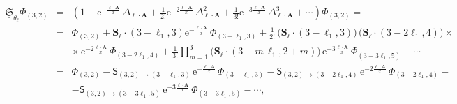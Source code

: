 \documentclass[11pt,a4paper]{article}
\newcommand{\rme}{{\mathrm{e}}}
\begin{document}
\begin{eqnarray}
\underline{\mathfrak{S}}_{\theta_{\boldsymbol{\ell}}} \Phi_{(3,2)} &=& \left( 1 + \rme^{-\frac{\boldsymbol{\ell} \cdot \boldsymbol{A}}{x}}\, \Delta_{\boldsymbol{\ell} \cdot \boldsymbol{A}} + \frac{1}{2!} \rme^{-2 \frac{\boldsymbol{\ell} \cdot \boldsymbol{A}}{x}}\, \Delta_{\boldsymbol{\ell} \cdot \boldsymbol{A}}^2 + \frac{1}{3!} \rme^{-3 \frac{\boldsymbol{\ell} \cdot \boldsymbol{A}}{x}}\, \Delta_{\boldsymbol{\ell} \cdot \boldsymbol{A}}^3 + \cdots \right) \Phi_{(3,2)} = \nonumber \\
&=& \Phi_{(3,2)} + \boldsymbol{S}_{\boldsymbol{\ell}} \cdot \left( 3-\ell_{1}, 3 \right) \rme^{-\frac{\boldsymbol{\ell} \cdot \boldsymbol{A}}{x}}\, \Phi_{\left( 3-\ell_{1}, 3 \right)} + \frac{1}{2!}\, \Big( \boldsymbol{S}_{\boldsymbol{\ell}} \cdot \left( 3-\ell_{1}, 3 \right) \Big)\, \Big( \boldsymbol{S}_{\boldsymbol{\ell}} \cdot \left( 3-2\ell_{1}, 4 \right) \Big) \times \nonumber \\
&&
\times\, \mathrm{e}^{-2 \frac{\boldsymbol{\ell}\cdot\boldsymbol{A}}{x}}\, \Phi_{\left( 3-2\ell_{1}, 4 \right)} + \frac{1}{3!} \prod_{m=1}^{3} \Big( \boldsymbol{S}_{\boldsymbol{\ell}} \cdot \left( 3-m\,\ell_{1}, 2+m \right) \Big)\, \rme^{-3\frac{\boldsymbol{\ell}\cdot\boldsymbol{A}}{x}}\, \Phi_{\left( 3-3\ell_{1}, 5 \right)} + \cdots \nonumber \\
&=& \Phi_{(3,2)} - \mathsf{S}_{(3,2)\to\left( 3-\ell_{1}, 3 \right)}\, \rme^{-\frac{\boldsymbol{\ell} \cdot \boldsymbol{A}}{x}}\, \Phi_{\left( 3-\ell_{1}, 3 \right)} - \mathsf{S}_{(3,2)\to\left( 3-2\ell_{1}, 4 \right)}\, \mathrm{e}^{-2 \frac{\boldsymbol{\ell}\cdot\boldsymbol{A}}{x}}\, \Phi_{\left( 3-2\ell_{1}, 4 \right)} - \nonumber \\
&&
- \mathsf{S}_{(3,2)\to\left( 3-3\ell_{1}, 5 \right)}\, \rme^{-3\frac{\boldsymbol{\ell}\cdot\boldsymbol{A}}{x}}\, \Phi_{\left( 3-3\ell_{1}, 5 \right)} - \cdots,
\label{eq:sec5-forward-Stokes-expanded}
\end{eqnarray}
%
\noindent
\end{document}
